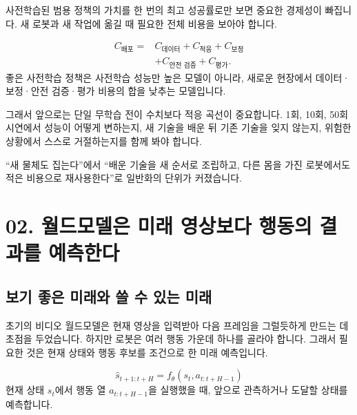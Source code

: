 \documentclass[11pt,openany]{book}
\begin{document}
사전학습된 범용 정책의 가치를 한 번의 최고 성공률로만 보면 중요한 경제성이 빠집니다. 새 로봇과 새 작업에 옮길 때 필요한 전체 비용을 보아야 합니다.

\begin{boardbox}[배포 비용의 구성 요소]
\[
\begin{aligned}
C_{\text{배포}}={}&
C_{\text{데이터}}
+C_{\text{적응}}
+C_{\text{보정}}\\
&+C_{\text{안전 검증}}
+C_{\text{평가}} .
\end{aligned}
\]
\small
좋은 사전학습 정책은 사전학습 성능만 높은 모델이 아니라, 새로운 현장에서 데이터·보정·안전 검증·평가 비용의 합을 낮추는 모델입니다.
\end{boardbox}

그래서 앞으로는 단일 무학습 전이 수치보다 적응 곡선이 중요합니다. 1회, 10회, 50회 시연에서 성능이 어떻게 변하는지, 새 기술을 배운 뒤 기존 기술을 잊지 않는지, 위험한 상황에서 스스로 거절하는지를 함께 봐야 합니다.

\begin{translationbox}
``새 물체도 집는다''에서 ``배운 기술을 새 순서로 조립하고, 다른 몸을 가진 로봇에서도 적은 비용으로 재사용한다''로 일반화의 단위가 커졌습니다.
\end{translationbox}

\section*{02. 월드모델은 미래 영상보다 행동의 결과를 예측한다}

\subsection*{보기 좋은 미래와 쓸 수 있는 미래}

초기의 비디오 월드모델은 현재 영상을 입력받아 다음 프레임을 그럴듯하게 만드는 데 초점을 두었습니다. 하지만 로봇은 여러 행동 가운데 하나를 골라야 합니다. 그래서 필요한 것은 현재 상태와 행동 후보를 조건으로 한 미래 예측입니다.

\begin{boardbox}[행동 조건부 가상 실행]
\[
\hat{s}_{t+1:t+H}
=f_\theta\!\left(s_t,a_{t:t+H-1}\right)
\]
\small
현재 상태 \(s_t\)에서 행동 열 \(a_{t:t+H-1}\)을 실행했을 때, 앞으로 관측하거나 도달할 상태를 예측합니다.
\end{boardbox}
\end{document}
